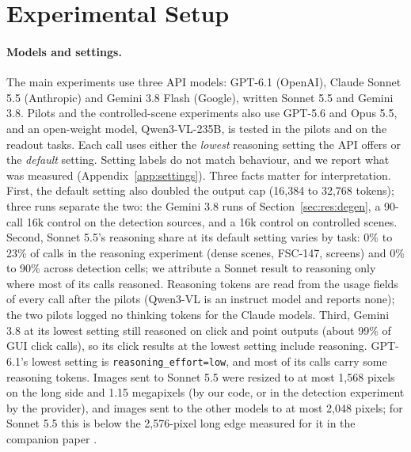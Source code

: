 \section{Experimental Setup}\label{sec:experiments}

\paragraph{Models and settings.} The main experiments use three API models: GPT-6.1 (OpenAI), Claude Sonnet 5.5 (Anthropic) and Gemini 3.8 Flash (Google), written Sonnet 5.5 and Gemini 3.8. Pilots and the controlled-scene experiments also use GPT-5.6 and Opus 5.5, and an open-weight model, Qwen3-VL-235B, is tested in the pilots and on the readout tasks. Each call uses either the \emph{lowest} reasoning setting the API offers or the \emph{default} setting. Setting labels do not match behaviour, and we report what was measured (Appendix~\ref{app:settings}). Three facts matter for interpretation. First, the default setting also doubled the output cap (16,384 to 32,768 tokens); three runs separate the two: the Gemini 3.8 runs of Section~\ref{sec:res:degen}, a 90-call 16k control on the detection sources, and a 16k control on controlled scenes. Second, Sonnet 5.5's reasoning share at its default setting varies by task: 0\% to 23\% of calls in the reasoning experiment (dense scenes, FSC-147, screens) and 0\% to 90\% across detection cells; we attribute a Sonnet result to reasoning only where most of its calls reasoned. Reasoning tokens are read from the usage fields of every call after the pilots (Qwen3-VL is an instruct model and reports none); the two pilots logged no thinking tokens for the Claude models. Third, Gemini 3.8 at its lowest setting still reasoned on click and point outputs (about 99\% of GUI click calls), so its click results at the lowest setting include reasoning. GPT-6.1's lowest setting is \texttt{reasoning\_effort=low}, and most of its calls carry some reasoning tokens. Images sent to Sonnet 5.5 were resized to at most 1,568 pixels on the long side and 1.15 megapixels (by our code, or in the detection experiment by the provider), and images sent to the other models to at most 2,048 pixels; for Sonnet 5.5 this is below the 2,576-pixel long edge measured for it in the companion paper \citep{shi2026zoomin}.

